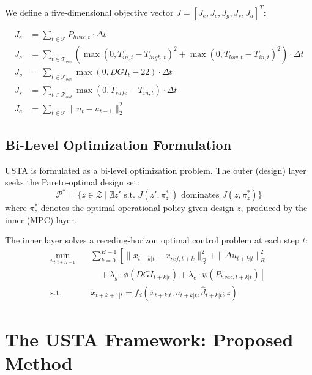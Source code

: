 \documentclass[5p,times,twocolumn]{elsarticle}
\begin{document}
We define a five-dimensional objective vector $J = [J_e, J_c, J_g, J_s, J_a]^T$:

\begin{align}
\label{eq:energy}
J_e &= \sum_{t \in \mathcal{T}} P_{hvac,t} \cdot \Delta t \\
\label{eq:comfort}
J_c &= \sum_{t \in \mathcal{T}_{occ}} \left( \max(0, T_{in,t} - T_{high,t})^2 + \max(0, T_{low,t} - T_{in,t})^2 \right) \cdot \Delta t \\
\label{eq:glare}
J_g &= \sum_{t \in \mathcal{T}_{occ}} \max(0, DGI_t - 22) \cdot \Delta t \\
\label{eq:survivability}
J_s &= \sum_{t \in \mathcal{T}_{out}} \max(0, T_{safe} - T_{in,t}) \cdot \Delta t \\
\label{eq:actuation}
J_a &= \sum_{t \in \mathcal{T}} \|u_t - u_{t-1}\|_2^2
\end{align}

\subsection{Bi-Level Optimization Formulation}

USTA is formulated as a bi-level optimization problem. The outer (design) layer seeks the Pareto-optimal design set:
\begin{equation}
\label{eq:pareto}
\mathcal{P}^* = \{ z \in \mathcal{Z} \mid \nexists z' \text{ s.t. } J(z', \pi^*_{z'}) \text{ dominates } J(z, \pi^*_z) \}
\end{equation}
where $\pi^*_z$ denotes the optimal operational policy given design $z$, produced by the inner (MPC) layer.

The inner layer solves a receding-horizon optimal control problem at each step $t$:
\begin{equation}
\label{eq:mpc}
\begin{aligned}
\min_{u_{t:t+H-1}} \quad & \sum_{k=0}^{H-1} \left[ \|x_{t+k|t} - x_{ref,t+k}\|_Q^2 + \|\Delta u_{t+k|t}\|_R^2 \right. \\
& \left. \quad + \lambda_g \cdot \phi(DGI_{t+k|t}) + \lambda_e \cdot \psi(P_{hvac,t+k|t}) \right] \\
\text{s.t.} \quad & x_{t+k+1|t} = f_d(x_{t+k|t}, u_{t+k|t}, \hat{d}_{t+k|t}; z)
\end{aligned}
\end{equation}

\section{The USTA Framework: Proposed Method}
\label{sec:method}
\end{document}
